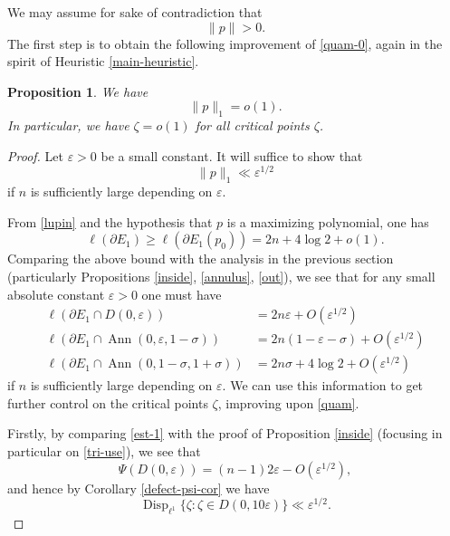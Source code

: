 \documentclass[12pt]{amsart}
\newtheorem{proposition}[theorem]{Proposition}
\newcommand{\eps}{\varepsilon}
\newcommand{\Disp}{\operatorname{Disp}_{\ell^1}}
\newcommand{\Ann}{\operatorname{Ann}}
\begin{document}
We may assume for sake of contradiction that
\begin{equation}\label{p-contra}
    \|p\| > 0.
\end{equation}
The first step is to obtain the following improvement of \eqref{quam-0}, again in the spirit of Heuristic \ref{main-heuristic}.

\begin{proposition}\label{ets}  We have
    $$ \|p\|_1 = o(1).$$
    In particular, we have $\zeta=o(1)$ for all critical points $\zeta$.
\end{proposition}

\begin{proof} Let $\eps > 0$ be a small constant. It will suffice to show that
\begin{equation}\label{sumzeta}
 \|p\|_1 \ll \eps^{1/2}
\end{equation}
if $n$ is sufficiently large depending on $\eps$.

From \eqref{lupin} and the hypothesis that $p$ is a maximizing polynomial, one has
\begin{equation}\label{eo}
     \ell(\partial E_1) \geq \ell(\partial E_1(p_0)) = 2n + 4 \log 2 + o(1).
\end{equation}
Comparing the above bound with the analysis in the previous section (particularly Propositions \ref{inside}, \ref{annulus}, \ref{out}), we see that for any small absolute constant $\eps>0$ one must have
\begin{align}
    \ell(\partial E_1 \cap D(0,\eps)) &= 2n\eps  + O(\eps^{1/2}) \label{est-1} \\
     \ell(\partial E_1 \cap \Ann(0,\eps,1-\sigma)) &= 2n (1-\eps-\sigma) +  O(\eps^{1/2}) \label{est-2} \\
      \ell(\partial E_1 \cap \Ann(0,1-\sigma,1+\sigma)) &= 2n \sigma + 4 \log 2 + O(\eps^{1/2}) \label{est-3}
\end{align}
if $n$ is sufficiently large depending on $\eps$.  We can use this information to get further control on the critical points $\zeta$, improving upon \eqref{quam}.

Firstly, by comparing \eqref{est-1} with the proof of Proposition \ref{inside} (focusing in particular on \eqref{tri-use}), we see that
$$ \Psi(D(0,\eps)) = (n-1) 2 \eps - O(\eps^{1/2}),$$
and hence by Corollary \ref{defect-psi-cor} we have
\begin{equation}\label{zet-1}
 \Disp \{ \zeta: \zeta \in D(0,10\eps)\} \ll \eps^{1/2}.
\end{equation}


\end{proof}
\end{document}

